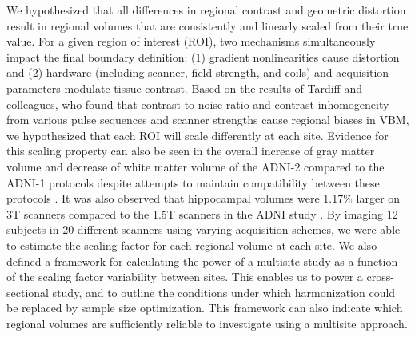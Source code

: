 We hypothesized that all differences in regional contrast and geometric distortion result in regional volumes that are consistently and linearly scaled from their true value. For a given region of interest (ROI), two mechanisms simultaneously impact the final boundary definition: (1) gradient nonlinearities cause distortion and (2) hardware  (including scanner, field strength, and coils) and acquisition parameters modulate tissue contrast. Based on the results of Tardiff and colleagues, who found that contrast-to-noise ratio and contrast inhomogeneity from various pulse sequences and scanner strengths cause regional biases in VBM\cite{tardif2010regional, tardif2009sensitivity}, we hypothesized that each ROI will scale differently at each site. Evidence for this scaling property can also be seen in the overall increase of gray matter volume and decrease of white matter volume of the ADNI-2 compared to the ADNI-1 protocols despite attempts to maintain compatibility between these protocols \cite{Brunton_2013}. It was also observed that hippocampal volumes were 1.17\% larger on 3T scanners compared to the 1.5T scanners in the ADNI study \cite{Wolz_2014}. By imaging 12 subjects in 20 different scanners using varying acquisition schemes, we were able to estimate the scaling factor for each regional volume at each site. We also defined a framework for calculating the power of a multisite study as a function of the scaling factor variability between sites. This enables us to power a cross-sectional study, and to outline the conditions under which harmonization could be replaced by sample size optimization. This framework can also indicate which regional volumes are sufficiently reliable to investigate using a multisite approach.
